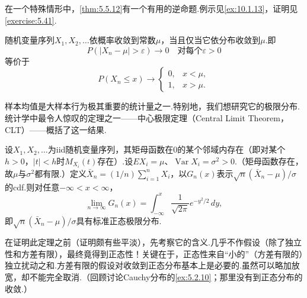 在一个特殊情形中，\autoref{thm:5.5.12}有一个有用的逆命题.例示见\autoref{ex:10.1.13}，证明见\autoref{exercise:5.41}.
\begin{theorem}\label{thm:5.5.13}
随机变量序列$X_1,X_2,\ldots$依概率收敛到常数$\mu$，当且仅当它依分布收敛到$\mu$.即
$$P(|X_n-\mu|>\varepsilon)\to0\quad\text{对每个$\varepsilon>0$}$$
等价于
$$P(X_n\le x)\to\begin{cases}0,&x<\mu,\\1,&x>\mu.\end{cases}$$
\end{theorem}
样本均值是大样本行为极其重要的统计量之一.特别地，我们想研究它的极限分布.统计学中最令人惊叹的定理之一——中心极限定理（Central Limit Theorem，CLT）——概括了这一结果.
\begin{theorem}[中心极限定理]\label{thm:5.5.14}
设$X_1,X_2,\ldots$为iid随机变量序列，其矩母函数在0的某个邻域内存在（即对某个$h>0$，$|t|<h$时$M_{X_i}(t)$存在）.设$EX_i=\mu$、$\operatorname{Var}X_i=\sigma^2>0$.（矩母函数存在，故$\mu$与$\sigma^2$都有限.）定义$\bar X_n=(1/n)\sum_{i=1}^nX_i$，以$G_n(x)$表示$\sqrt n(\bar X_n-\mu)/\sigma$的cdf.则对任意$-\infty<x<\infty$，
$$\lim_{n\to\infty}G_n(x)=\int_{-\infty}^x\frac1{\sqrt{2\pi}}e^{-y^2/2}\,dy,$$
即$\sqrt n(\bar X_n-\mu)/\sigma$具有标准正态极限分布.
\end{theorem}
在证明此定理之前（证明颇有些平淡），先考察它的含义.几乎不作假设（除了独立性和方差有限），最终竟得到正态性！关键在于，正态性来自“小的”（方差有限的）独立扰动之和.方差有限的假设对收敛到正态分布基本上是必要的.虽然可以略加放宽，却不能完全取消.（回顾讨论Cauchy分布的\autoref{ex:5.2.10}；那里没有到正态分布的收敛.）

